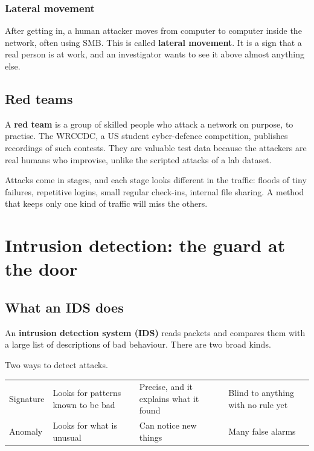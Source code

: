\subsection{Lateral movement}
After getting in, a human attacker moves from computer to computer inside the network, often using SMB. This is called \textbf{lateral movement}. It is a sign that a real person is at work, and an investigator wants to see it above almost anything else.

\section{Red teams}
A \textbf{red team} is a group of skilled people who attack a network on purpose, to practise. The WRCCDC, a US student cyber-defence competition, publishes recordings of such contests. They are valuable test data because the attackers are real humans who improvise, unlike the scripted attacks of a lab dataset.

\begin{recap}
Attacks come in stages, and each stage looks different in the traffic: floods of tiny failures, repetitive logins, small regular check-ins, internal file sharing. A method that keeps only one kind of traffic will miss the others.
\end{recap}

\chapter{Intrusion detection: the guard at the door}
\label{ch:ids}

\section{What an IDS does}
An \textbf{intrusion detection system (IDS)} reads packets and compares them with a large list of descriptions of bad behaviour. There are two broad kinds.

\begin{gtable}{Two ways to detect attacks.}
\begin{tabularx}{\linewidth}{l L L L}
\toprule
{} &  &  & \\
\midrule
Signature & Looks for patterns known to be bad & Precise, and it explains what it found & Blind to anything with no rule yet\\
Anomaly & Looks for what is unusual & Can notice new things & Many false alarms~\cite{outside}\\
\bottomrule
\end{tabularx}
\end{gtable}

